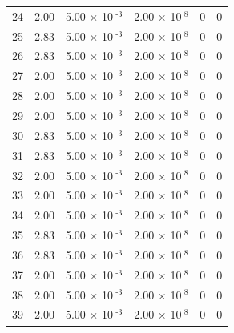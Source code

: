 \documentclass[a4paper,11pt]{article}
\begin{document}
\begin{center}
\begin{longtable}{|R{1.5cm}|R{2.4cm}|R{2.4cm}|R{2.4cm}|R{2.4cm}|R{2.4cm}|}
   24 &   2.00  &         5.00 $\times$ 10$^{\text{          -3}}$  &         2.00 $\times$ 10$^{\text{           8}}$  & 0  & 0 \\
   25 &   2.83  &         5.00 $\times$ 10$^{\text{          -3}}$  &         2.00 $\times$ 10$^{\text{           8}}$  & 0  & 0 \\
   26 &   2.83  &         5.00 $\times$ 10$^{\text{          -3}}$  &         2.00 $\times$ 10$^{\text{           8}}$  & 0  & 0 \\
   27 &   2.00  &         5.00 $\times$ 10$^{\text{          -3}}$  &         2.00 $\times$ 10$^{\text{           8}}$  & 0  & 0 \\
   28 &   2.00  &         5.00 $\times$ 10$^{\text{          -3}}$  &         2.00 $\times$ 10$^{\text{           8}}$  & 0  & 0 \\
   29 &   2.00  &         5.00 $\times$ 10$^{\text{          -3}}$  &         2.00 $\times$ 10$^{\text{           8}}$  & 0  & 0 \\
   30 &   2.83  &         5.00 $\times$ 10$^{\text{          -3}}$  &         2.00 $\times$ 10$^{\text{           8}}$  & 0  & 0 \\
   31 &   2.83  &         5.00 $\times$ 10$^{\text{          -3}}$  &         2.00 $\times$ 10$^{\text{           8}}$  & 0  & 0 \\
   32 &   2.00  &         5.00 $\times$ 10$^{\text{          -3}}$  &         2.00 $\times$ 10$^{\text{           8}}$  & 0  & 0 \\
   33 &   2.00  &         5.00 $\times$ 10$^{\text{          -3}}$  &         2.00 $\times$ 10$^{\text{           8}}$  & 0  & 0 \\
   34 &   2.00  &         5.00 $\times$ 10$^{\text{          -3}}$  &         2.00 $\times$ 10$^{\text{           8}}$  & 0  & 0 \\
   35 &   2.83  &         5.00 $\times$ 10$^{\text{          -3}}$  &         2.00 $\times$ 10$^{\text{           8}}$  & 0  & 0 \\
   36 &   2.83  &         5.00 $\times$ 10$^{\text{          -3}}$  &         2.00 $\times$ 10$^{\text{           8}}$  & 0  & 0 \\
   37 &   2.00  &         5.00 $\times$ 10$^{\text{          -3}}$  &         2.00 $\times$ 10$^{\text{           8}}$  & 0  & 0 \\
   38 &   2.00  &         5.00 $\times$ 10$^{\text{          -3}}$  &         2.00 $\times$ 10$^{\text{           8}}$  & 0  & 0 \\
   39 &   2.00  &         5.00 $\times$ 10$^{\text{          -3}}$  &         2.00 $\times$ 10$^{\text{           8}}$  & 0  & 0 \\

\end{longtable}
\end{center}
\end{document}
